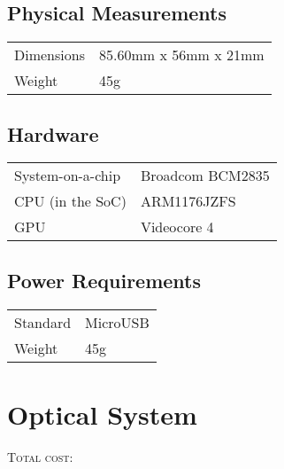 \subsection{Physical Measurements}

\begin{tabular}{p{} p{}}
\hline
Dimensions & 85.60mm x 56mm x 21mm \\
Weight & 45g \\ \hline
\end{tabular}

\subsection{Hardware}

\begin{tabular}{p{} p{}} 
\hline
System-on-a-chip & Broadcom BCM2835 \\
CPU (in the SoC) & ARM1176JZFS \\
GPU & Videocore 4 \\ \hline
\end{tabular}

\subsection{Power Requirements}

\begin{tabular}{p{} p{}}
\hline
Standard & MicroUSB \\
Weight & 45g \\ \hline
\end{tabular}

\section{Optical System}
\textsc{Total cost: }
